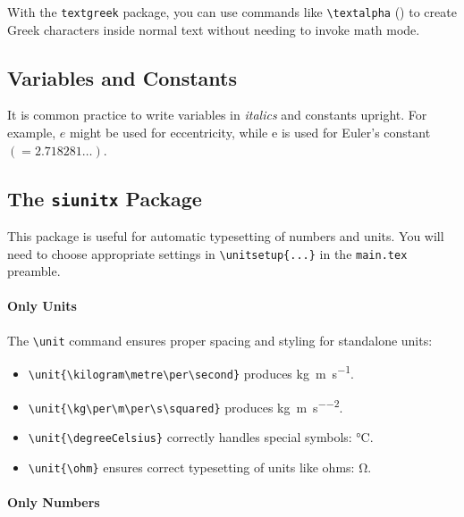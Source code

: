 With the \verb|textgreek| package, you can use commands like \verb|\textalpha| (\textalpha) to create Greek characters inside normal text without needing to invoke math mode.

\subsection{Variables and Constants}

It is common practice to write variables in \textit{italics} and constants upright. For example, $e$ might be used for eccentricity, while $\mathrm{e}$ is used for Euler's constant $(=\num{2.718281}\dots)$.


\subsection{The \texttt{siunitx} Package}

This package is useful for automatic typesetting of numbers and units. You will need to choose appropriate settings in \verb|\unitsetup{...}| in the \verb|main.tex| preamble. %

\paragraph*{Only Units}

The \verb|\unit| command ensures proper spacing and styling for standalone units:
\begin{itemize}
    \item \verb|\unit{\kilogram\metre\per\second}| produces \unit{\kilogram\metre\per\second}.
    \item \verb|\unit{\kg\per\m\per\s\squared}| produces \unit{\kg\per\m\per\s\squared}.
    \item \verb|\unit{\degreeCelsius}| correctly handles special symbols: \unit{\degreeCelsius}.
    \item \verb|\unit{\ohm}| ensures correct typesetting of units like ohms: \unit{\ohm}.
\end{itemize}

\paragraph*{Only Numbers}

